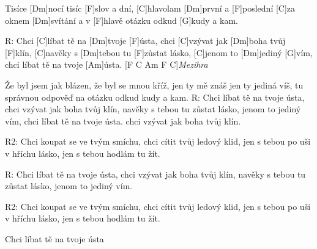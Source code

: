 
Tisíce [Dm]nocí tisíc [F]slov a dní,
[C]hlavolam [Dm]první a [F]poslední
[C]za oknem [Dm]svítání a v [F]hlavě otázku odkud [G]kudy a kam.

R:
Chci [C]líbat tě na [Dm]tvoje [F]\null ústa,
chci [C]vzývat jak [Dm]boha tvůj [F]klín,
[C]navěky s [Dm]tebou tu [F]zůstat lásko,
[C]jenom to [Dm]jediný [G]vím,
chci líbat tě na tvoje [Am]\null ústa.
[F C Am F C]\null\textit{Mezihra}

Že byl jsem jak blázen,
že byl se mnou kříž,
jen ty mě znáš jen ty jediná víš,
tu správnou odpověď na otázku odkud kudy a kam.
\slpc
R:
Chci líbat tě na tvoje ústa,
chci vzývat jak boha tvůj klín,
navěky s tebou tu zůstat lásko,
jenom to jediný vím,
chci líbat tě na tvoje ústa.
chci vzývat jak boha tvůj klín.

R2:
Chci koupat se ve tvým smíchu,
chci cítit tvůj ledový klid,
jen s tebou po uši v hříchu lásko,
jen s tebou hodlám tu žít.

R:
Chci líbat tě na tvoje ústa,
chci vzývat jak boha tvůj klín,
navěky s tebou tu zůstat lásko,
jenom to jediný vím.

R2:
Chci koupat se ve tvým smíchu,
chci cítit tvůj ledový klid,
jen s tebou po uši v hříchu lásko,
jen s tebou hodlám tu žít.

Chci líbat tě na tvoje ústa


